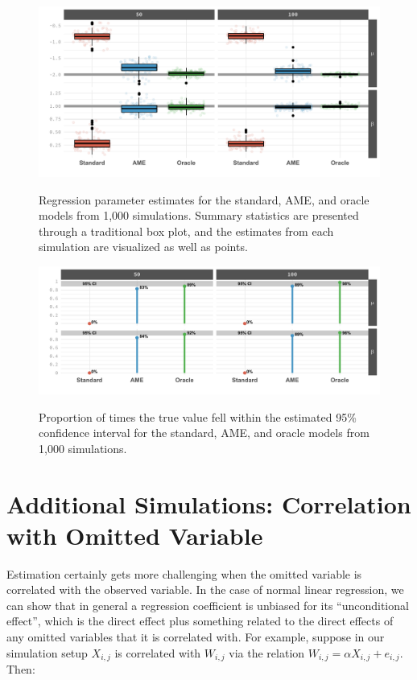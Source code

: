 \begin{figure}[ht]
	\centering
	\caption{Regression parameter estimates for the standard, AME, and oracle models from 1,000 simulations. Summary statistics are presented through a traditional box plot, and the estimates from each simulation are visualized as well as points.}
	\label{fig:ameBias_asa}
	\includegraphics[width=1\textwidth]{graphics/ameSimBias_all_asaProbit.pdf} \\
\end{figure}

\begin{figure}[ht]
	\centering
	\caption{Proportion of times the true value fell within the estimated 95\% confidence interval for the standard, AME, and oracle models from 1,000 simulations.}
	\label{fig:ameCalib_asa}
	\includegraphics[width=1\textwidth]{graphics/ameSimCover_all_asaProbit.pdf} \\
\end{figure}

\FloatBarrier
\clearpage

\section{Additional Simulations: Correlation with Omitted Variable}

Estimation certainly gets more challenging when the omitted variable is correlated with the observed variable. In the case of normal linear regression, we can show that in general a regression coefficient is unbiased for its ``unconditional effect'', which is the direct effect plus something related to the direct effects of any omitted variables that it is correlated with. For example, suppose in our simulation setup $X_{i,j}$ is correlated with $W_{i,j}$ via the relation $W_{i,j} = \alpha X_{i,j} + e_{i,j}$. Then:

